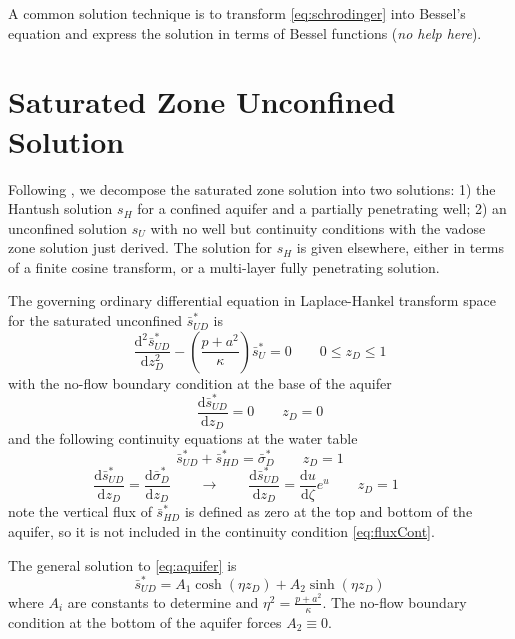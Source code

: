 \documentclass[12pt,letterpaper]{article}
\begin{document}
A common solution technique is to transform \eqref{eq:schrodinger}
into Bessel's equation and express the solution in terms of Bessel
functions (\textit{no help here}).

\section{Saturated Zone Unconfined Solution}
Following \cite{mishra10}, we decompose the saturated zone solution
into two solutions: 1) the Hantush solution $s_H$ for a confined
aquifer and a partially penetrating well; 2) an unconfined solution
$s_U$ with no well but continuity conditions with the vadose zone
solution just derived.  The solution for $s_H$ is given elsewhere,
either in terms of a finite cosine transform, or a multi-layer fully
penetrating solution.

The governing ordinary differential equation in Laplace-Hankel
transform space for the saturated unconfined $\bar{s}^{\ast}_{UD}$ is
\begin{equation}
  \label{eq:aquifer}
  \frac{\mathrm{d}^2 \bar{s}_{UD}^{\ast}}{\mathrm{d} z_D^2} - \left( \frac{p + a^2}{\kappa} \right)\bar{s}_U^{\ast} = 0 \qquad 0 \le z_D \le 1
\end{equation}
with the no-flow boundary condition at the base of the aquifer
\begin{equation}\nonumber
 \frac{\mathrm{d} \bar{s}_{UD}^{\ast}}{\mathrm{d} z_D} = 0 \qquad z_D=0
\end{equation}
and the following continuity equations at the water table
\begin{equation}
  \label{eq:headCont}
  \bar{s}_{UD}^{\ast} + \bar{s}_{HD}^{\ast} = \bar{\sigma}_D^{\ast} \qquad z_D=1
\end{equation}
\begin{equation}
  \label{eq:fluxCont}
  \frac{\mathrm{d} \bar{s}_{UD}^{\ast}}{\mathrm{d} z_D}  = \frac{\mathrm{d}
    \bar{\sigma}_D^{\ast}}{\mathrm{d} z_D} \qquad \rightarrow \qquad \frac{\mathrm{d} \bar{s}_{UD}^{\ast}}{\mathrm{d} z_D}  = \frac{\mathrm{d}u}{\mathrm{d} \zeta} e^u \qquad z_D=1
  \qquad
\end{equation}
note the vertical flux of $\bar{s}_{HD}^{\ast}$ is defined as zero at
the top and bottom of the aquifer, so it is not included in the
continuity condition \eqref{eq:fluxCont}.

The general solution to \eqref{eq:aquifer} is
\begin{equation}
  \label{eq:su}
  \bar{s}_{UD}^{\ast} = A_1 \cosh(\eta z_D) + A_2 \sinh(\eta z_D)
\end{equation}
where $A_i$ are constants to determine and $\eta^2 = \frac{p +
  a^2}{\kappa}$.  The no-flow boundary condition at the bottom of the
aquifer forces $A_2\equiv 0$.
\end{document}
